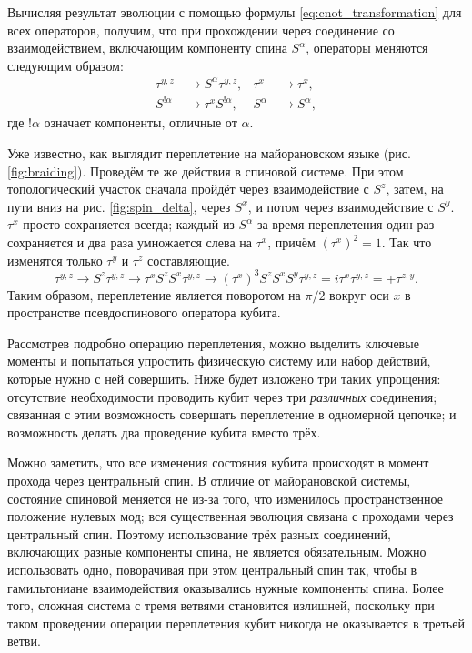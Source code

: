 \documentclass[a4paper,12pt]{article}
\theoremstyle{plain} %
\theoremstyle{definition} %
\theoremstyle{remark} %
\begin{document}
Вычисляя результат эволюции с помощью формулы \ref{eq:cnot_transformation} для всех операторов, получим, что при прохождении через соединение со взаимодействием, включающим компоненту спина $S^\alpha$, операторы меняются следующим образом:
\begin{align}
    \tau^{y,z} &\rightarrow S^\alpha \tau^{y,z}, & \tau^x &\rightarrow \tau^x, \\
    S^{!\alpha} &\rightarrow \tau^x S^{!\alpha}, & S^\alpha &\rightarrow S^\alpha,
    \label{eq:spin_transformation}
\end{align}
где $!\alpha$ означает компоненты, отличные от $\alpha$.

Уже известно, как выглядит переплетение на майорановском языке (рис. \ref{fig:braiding}). Проведём те же действия в спиновой системе. При этом топологический участок сначала пройдёт через взаимодействие с $S^z$, затем, на пути вниз на рис. \ref{fig:spin_delta}, через $S^x$, и потом через взаимодействие с $S^y$. $\tau^x$ просто сохраняется всегда; каждый из $S^\alpha$ за время переплетения один раз сохраняется и два раза умножается слева на $\tau^x$, причём $\left( \tau^x \right)^2 = 1$. Так что изменятся только $\tau^y$ и $\tau^z$ составляющие.
\begin{equation}
    \tau^{y,z} \rightarrow S^z \tau^{y,z} \rightarrow \tau^x S^z S^x \tau^{y,z} \rightarrow \left( \tau^x \right)^3 S^z S^x S^y \tau^{y,z} = i \tau^x \tau^{y,z} = \mp \tau^{z,y}.
\end{equation}
Таким образом, переплетение является поворотом на $\pi/2$ вокруг оси $x$ в пространстве псевдоспинового оператора кубита.

Рассмотрев подробно операцию переплетения, можно выделить ключевые моменты и попытаться упростить физическую систему или набор действий, которые нужно с ней совершить. Ниже будет изложено три таких упрощения: отсутствие необходимости проводить кубит через три \textit{различных} соединения; связанная с этим возможность совершать переплетение в одномерной цепочке; и возможность делать два проведение кубита вместо трёх. 

Можно заметить, что все изменения состояния кубита происходят в момент прохода через центральный спин. В отличие от майорановской системы, состояние спиновой меняется не из-за того, что изменилось пространственное положение нулевых мод; вся существенная эволюция связана с проходами через центральный спин. Поэтому использование трёх разных соединений, включающих разные компоненты спина, не является обязательным. Можно использовать одно, поворачивая при этом центральный спин так, чтобы в гамильтониане взаимодействия оказывались нужные компоненты спина. Более того, сложная система с тремя ветвями становится излишней, поскольку при таком проведении операции переплетения кубит никогда не оказывается в третьей ветви.
\end{document}
